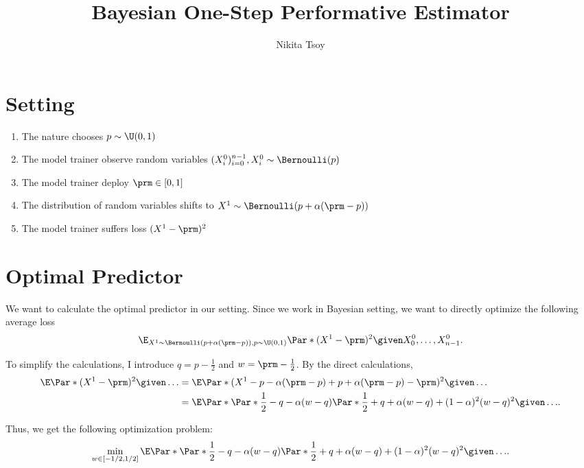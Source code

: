 \documentclass{article}
\title{Bayesian One-Step Performative Estimator}
\author{Nikita Tsoy}
\begin{document}
\maketitle

\section{Setting}

\begin{enumerate}
    \item The nature chooses $p \sim \U(0, 1)$
    \item The model trainer observe random variables $(X^0_i)_{i=0}^{n-1},
        X^0_i \sim \Bernoulli(p)$
    \item The model trainer deploy $\prm \in [0, 1]$
    \item The distribution of random variables shifts to $X^1 \sim
        \Bernoulli(p + \alpha (\prm - p))$
    \item The model trainer suffers loss $(X^1 - \prm)^2$
\end{enumerate}

\section{Optimal Predictor}

We want to calculate the optimal predictor in our setting. Since we work in
Bayesian setting, we want to directly optimize the following average loss
\[
    \E_{X^1 \sim \Bernoulli(p + \alpha (\prm - p)), p \sim \U(0, 1)}\Par*{(X^1
    - \prm)^2 \given X^0_0, \dots, X^0_{n-1}}.
\]

To simplify the calculations, I introduce $q = p - \frac{1}{2}$ and $w = \prm -
\frac{1}{2}$. By the direct calculations,
\[
    \begin{split}
        \E\Par*{(X^1 - \prm)^2 \given \dots}
        &= \E\Par*{(X^1 - p - \alpha (\prm - p) + p + \alpha (\prm - p) -
        \prm)^2 \given \dots}\\
        &= \E\Par*{\Par*{\frac{1}{2} - q - \alpha (w - q)} \Par*{\frac{1}{2} +
        q + \alpha (w - q)} + (1 - \alpha)^2 (w - q)^2 \given \dots}.
    \end{split}
\]

Thus, we get the following optimization problem:
\[
    \min_{w \in [-1/2,1/2]} \E\Par*{\Par*{\frac{1}{2} - q - \alpha (w - q)}
    \Par*{\frac{1}{2} + q + \alpha (w - q)} + (1 - \alpha)^2 (w - q)^2 \given
    \dots}.
\]
\end{document}
